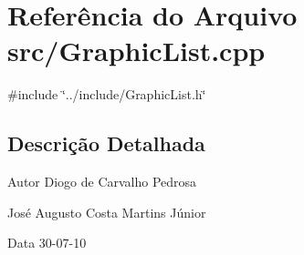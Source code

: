 \section{Referência do Arquivo src/GraphicList.cpp}
\label{GraphicList_8cpp}
{\ttfamily \#include \char`\"{}../include/GraphicList.h\char`\"{}}\par


\subsection{Descrição Detalhada}
\begin{DoxyAuthor}{Autor}
Diogo de Carvalho Pedrosa 

José Augusto Costa Martins Júnior 
\end{DoxyAuthor}
\begin{DoxyDate}{Data}
30-\/07-\/10 
\end{DoxyDate}
